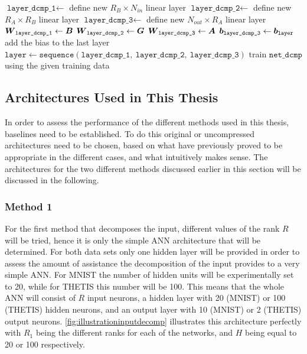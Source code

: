 \begin{algorithm}
\begin{algorithmic}[1]
        \State $\texttt{layer\_dcmp\_1} \leftarrow $ define new $R_B \times N_{in}$ linear layer 
        \State $\texttt{layer\_dcmp\_2} \leftarrow $ define new $R_A \times R_B$ linear layer 
        \State $\texttt{layer\_dcmp\_3} \leftarrow $ define new $N_{out} \times R_A$ linear layer 
        \State $\boldsymbol{W}_{\texttt{layer\_dcmp\_1}} \leftarrow \boldsymbol{B}$ 
        \State $\boldsymbol{W}_{\texttt{layer\_dcmp\_2}} \leftarrow \boldsymbol{G}$
        \State $\boldsymbol{W}_{\texttt{layer\_dcmp\_3}} \leftarrow \boldsymbol{A}$ 
        \State $\boldsymbol{b}_{\texttt{layer\_dcmp\_3}} \leftarrow \boldsymbol{b}_{\texttt{layer}}$ add the bias to the last layer 
        \State $\texttt{layer} \leftarrow \texttt{sequence}(\texttt{layer\_dcmp\_1}, \ \texttt{layer\_dcmp\_2}, \ \texttt{layer\_dcmp\_3})$
    \EndFor
    \State train $\texttt{net\_dcmp}$ using the given training data 
\end{algorithmic}
\end{algorithm}

\subsection{Architectures Used in This Thesis} \label{tex:architectures}
In order to assess the performance of the different methods used in this thesis, baselines need to be established. To do this original or uncompressed architectures need to be chosen, based on what have previously proved to be appropriate in the different cases, and what intuitively makes sense. The architectures for the two different methods discussed earlier in this section will be discussed in the following.

\subsubsection{Method 1}
For the first method that decomposes the input, different values of the rank $R$ will be tried, hence it is only the simple ANN architecture that will be determined. For both data sets only one hidden layer will be provided in order to assess the amount of assistance the decomposition of the input provides to a very simple ANN. For MNIST the number of hidden units will be experimentally set to 20, while for THETIS this number will be 100. This means that the whole ANN will consist of $R$ input neurons, a hidden layer with 20 (MNIST) or 100 (THETIS) hidden neurons, and an output layer with 10 (MNIST) or 2 (THETIS) output neurons. \autoref{fig:illustrationinputdecomp} illustrates this architecture perfectly with $R_1$ being the different ranks for each of the networks, and $H$ being equal to 20 or 100 respectively.

